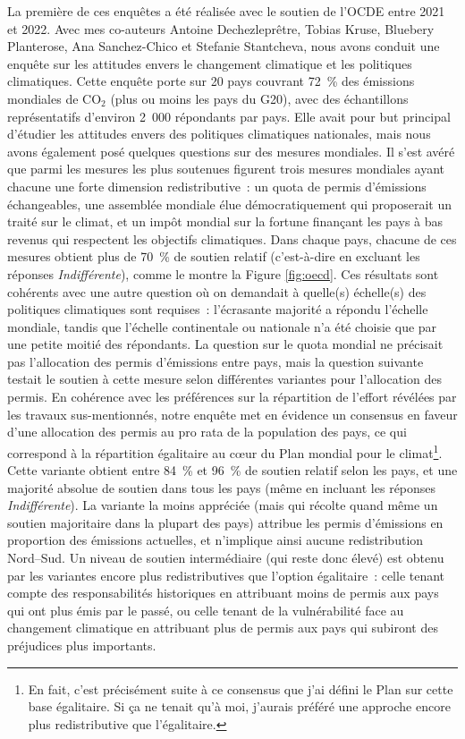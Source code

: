 \documentclass[a5paper,french]{memoir}
\begin{document}
La première de ces enquêtes a été réalisée avec le soutien de l'OCDE entre 2021 et 2022. Avec mes co-auteurs Antoine Dechezleprêtre, Tobias Kruse, Bluebery Planterose, Ana Sanchez-Chico et Stefanie Stantcheva, nous avons conduit une enquête sur les attitudes envers le changement climatique et les politiques climatiques. Cette enquête porte sur 20 pays couvrant 72~\% des émissions mondiales de CO$_\text{2}$ (plus ou moins les pays du G20), avec des échantillons représentatifs d'environ 2~000 répondants par pays. Elle avait pour but principal d'étudier les attitudes envers des politiques climatiques nationales, mais nous avons également posé quelques questions sur des mesures mondiales. Il s'est avéré que parmi les mesures les plus soutenues figurent trois mesures mondiales ayant chacune une forte dimension redistributive~: un quota de permis d'émissions échangeables, une assemblée mondiale élue démocratiquement qui proposerait un traité sur le climat, et un impôt mondial sur la fortune finançant les pays à bas revenus qui respectent les objectifs climatiques. Dans chaque pays, chacune de ces mesures obtient plus de 70~\% de soutien relatif (c'est-à-dire en excluant les réponses \textit{Indifférent\textperiodcentered{}e}), comme le montre la Figure \ref{fig:oecd}. Ces résultats sont cohérents avec une autre question où on demandait à quelle(s) échelle(s) des politiques climatiques sont requises~: %
l'écrasante majorité a répondu l'échelle mondiale, tandis que l'échelle continentale ou nationale n'a été choisie que par une petite moitié des répondants. La question sur le quota mondial ne précisait pas l'allocation des permis d'émissions entre pays, mais la question suivante testait le soutien à cette mesure selon différentes variantes pour l'allocation des permis. En cohérence avec les préférences sur la répartition de l'effort révélées par les travaux sus-mentionnés, notre enquête met en évidence un consensus en faveur d'une allocation des permis au pro rata de la population des pays, ce qui correspond à la répartition égalitaire au cœur du Plan mondial pour le climat\footnote{En fait, c'est précisément suite à ce consensus que j'ai défini le Plan sur cette base égalitaire. Si ça ne tenait qu'à moi, j'aurais préféré une approche encore plus redistributive que l'égalitaire.}. Cette variante obtient entre 84~\% et 96~\% de soutien relatif selon les pays, et une majorité absolue de soutien dans tous les pays (même en incluant les réponses \textit{Indifférent\textperiodcentered{}e}). La variante la moins appréciée (mais qui récolte quand même un soutien majoritaire dans la plupart des pays) attribue les permis d'émissions en proportion des émissions actuelles, et n'implique ainsi aucune redistribution Nord--Sud. Un niveau de soutien intermédiaire (qui reste donc élevé) est obtenu par les variantes encore plus redistributives que l'option égalitaire~: celle tenant compte des responsabilités historiques en attribuant moins de permis aux pays qui ont plus émis par le passé, ou celle tenant de la vulnérabilité face au changement climatique en attribuant plus de permis aux pays qui subiront des préjudices plus importants. 
\end{document}
